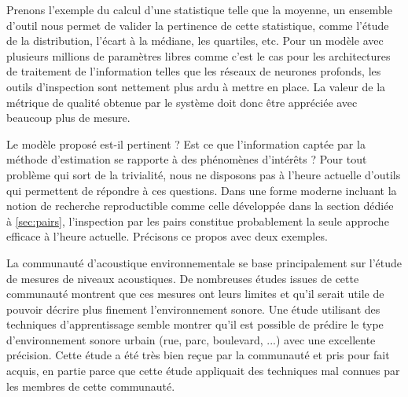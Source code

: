   Prenons l'exemple du calcul d'une statistique telle que la moyenne, un ensemble d'outil nous permet de valider la pertinence de cette statistique, comme l'étude de la distribution, l'écart à la médiane, les quartiles, etc. Pour un modèle avec plusieurs millions de paramètres libres comme c'est le cas pour les architectures de traitement de l'information telles que les réseaux de neurones profonds, les outils d'inspection sont nettement plus ardu à mettre en place. La valeur de la métrique de qualité obtenue par le système doit donc être appréciée avec beaucoup plus de mesure.

  Le modèle proposé est-il pertinent ? Est ce que l'information captée par la méthode d'estimation se rapporte à des phénomènes d'intérêts ? Pour tout problème qui sort de la trivialité, nous ne disposons pas à l'heure actuelle d'outils qui permettent de répondre à ces questions. Dans une forme moderne incluant la notion de recherche reproductible comme celle développée dans la section dédiée à \ref{sec:pairs}, l'inspection par les pairs constitue probablement la seule approche efficace à l'heure actuelle. Précisons ce propos avec deux exemples.

  La communauté d'acoustique environnementale se base principalement sur l'étude de mesures de niveaux acoustiques. De nombreuses études issues de cette communauté montrent que ces mesures ont leurs limites\cite{lavandier2006contribution} et qu'il serait utile de pouvoir décrire plus finement l'environnement sonore. Une étude utilisant des techniques d'apprentissage semble montrer qu'il est possible de prédire le type d'environnement sonore urbain (rue, parc, boulevard, ...) avec une excellente précision\cite{aucouturier2007bag}. Cette étude a été très bien reçue par la communauté et pris pour fait acquis, en partie parce que cette étude appliquait des techniques mal connues par les membres de cette communauté.


